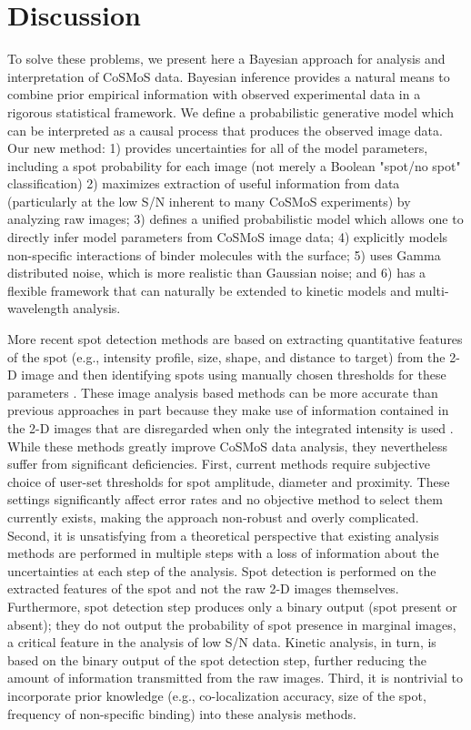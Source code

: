 \section{Discussion}

To solve these problems, we present here a Bayesian approach for analysis and interpretation of CoSMoS data. Bayesian inference provides a natural means to combine prior empirical information with observed experimental data in a rigorous statistical framework. We define a probabilistic generative model which can be interpreted as a causal process that produces the observed image data.  Our new method: 1) provides uncertainties for all of the model parameters, including a spot probability for each image (not merely a Boolean "spot/no spot" classification) 2) maximizes extraction of useful information from data (particularly at the low S/N inherent to many CoSMoS experiments) by analyzing raw images; 3) defines a unified probabilistic model which allows one to directly infer model parameters from CoSMoS image data; 4) explicitly models non-specific interactions of binder molecules with the surface; 5) uses Gamma distributed noise, which is more realistic than Gaussian noise; and 6) has a flexible framework that can naturally be extended to kinetic models and multi-wavelength analysis. 

More recent spot detection methods are based on extracting quantitative features of the spot (e.g., intensity profile, size, shape, and distance to target) from the 2-D image and then identifying spots using manually chosen thresholds for these parameters \cite{Friedman2015-nx, Smith2019-yb}. These image analysis based methods can be more accurate than previous approaches in part because they make use of information contained in the 2-D images that are disregarded when only the integrated intensity is used \cite{Friedman2015-nx}. While these methods greatly improve CoSMoS data analysis, they nevertheless suffer from significant deficiencies. First, current methods require subjective choice of user-set thresholds for spot amplitude, diameter and proximity. These settings significantly affect error rates and no objective method to select them currently exists, making the approach non-robust and overly complicated. Second, it is unsatisfying from a theoretical perspective that existing analysis methods are performed in multiple steps with a loss of information about the uncertainties at each step of the analysis. Spot detection is performed on the extracted features of the spot and not the raw 2-D images themselves. Furthermore, spot detection step produces only a binary output (spot present or absent); they do not output the probability of spot presence in marginal images, a critical feature in the analysis of low S/N data. Kinetic analysis, in turn, is based on the binary output of the spot detection step, further reducing the amount of information transmitted from the raw images. Third, it is nontrivial to incorporate prior knowledge (e.g., co-localization accuracy, size of the spot, frequency of non-specific binding) into these analysis methods.

